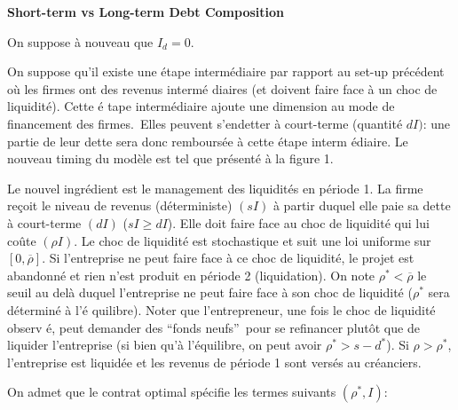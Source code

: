 \documentclass[a4paper]{article}
\begin{document}
\textbf{Short-term vs Long-term Debt Composition}

\bigskip

On suppose \`{a} nouveau que $I_{d}=0.$

On suppose qu'il existe une \'{e}tape interm\'{e}diaire par rapport au
set-up pr\'{e}c\'{e}dent o\`{u} les firmes ont des revenus interm\'{e}%
diaires (et doivent faire face \`{a} un choc de liquidit\'{e}). Cette \'{e}%
tape interm\'{e}diaire ajoute une dimension au mode de financement des
firmes.\ Elles peuvent s'endetter \`{a} court-terme (quantit\'{e} $dI)$: une
partie de leur dette sera donc rembours\'{e}e \`{a} cette \'{e}tape interm%
\'{e}diaire. Le nouveau timing du mod\`{e}le est tel que pr\'{e}sent\'{e} 
\`{a} la figure 1.

\bigskip

Le nouvel ingr\'{e}dient est le management des liquidit\'{e}s en p\'{e}riode
1. La firme re\c{c}oit le niveau de revenus (d\'{e}terministe) $(sI)$ \`{a}
partir duquel elle paie sa dette \`{a} court-terme $(dI)$ ($sI\geq dI$).
Elle doit faire face au choc de liquidit\'{e} qui lui co\^{u}te $(\rho I)$.
Le choc de liquidit\'{e} est stochastique et suit une loi uniforme sur $%
\left[ 0,\overline{\rho }\right] $. Si l'entreprise ne peut faire face \`{a}
ce choc de liquidit\'{e}, le projet est abandonn\'{e} et rien n'est produit
en p\'{e}riode 2 (liquidation). On note $\rho ^{\ast }<\overline{\rho }$ le
seuil au del\`{a} duquel l'entreprise ne peut faire face \`{a} son choc de
liquidit\'{e} ($\rho ^{\ast }$ sera d\'{e}termin\'{e} \`{a} l'\'{e}%
quilibre). Noter que l'entrepreneur, une fois le choc de liquidit\'{e} observ%
\'{e}, peut demander des \textquotedblleft fonds neufs\textquotedblright\
pour se refinancer plut\^{o}t que de liquider l'entreprise (si bien qu'\`{a}
l'\'{e}quilibre, on peut avoir $\rho ^{\ast }>s-d^{\ast }$). Si $\rho >\rho
^{\ast }$, l'entreprise est liquid\'{e}e et les revenus de p\'{e}riode 1
sont vers\'{e}s au cr\'{e}anciers.

\bigskip

On admet que le contrat optimal sp\'{e}cifie les termes suivants $(\rho
^{\ast },I)$:
\end{document}

